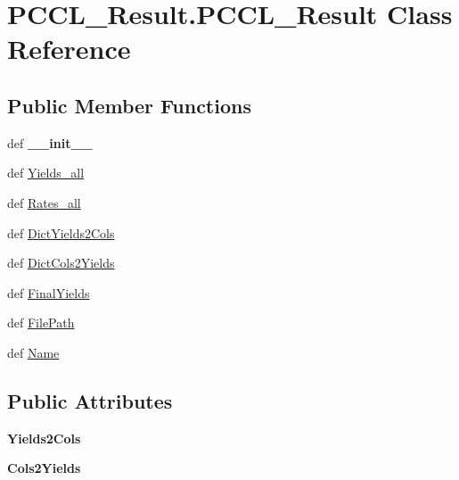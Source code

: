 \hypertarget{classPCCL__Result_1_1PCCL__Result}{\section{\-P\-C\-C\-L\-\_\-\-Result.\-P\-C\-C\-L\-\_\-\-Result \-Class \-Reference}
\label{classPCCL__Result_1_1PCCL__Result}
}
\subsection*{\-Public \-Member \-Functions}
\begin{DoxyCompactItemize}
\item 
\hypertarget{classPCCL__Result_1_1PCCL__Result_af3390b5f925964d5227a969d577efe32}{def {\bfseries \-\_\-\-\_\-init\-\_\-\-\_\-}}\label{classPCCL__Result_1_1PCCL__Result_af3390b5f925964d5227a969d577efe32}

\item 
def \hyperlink{classPCCL__Result_1_1PCCL__Result_a199c995af0719c0500a23e7092df6ad1}{\-Yields\-\_\-all}
\item 
def \hyperlink{classPCCL__Result_1_1PCCL__Result_a04fd246373c3dfa3360826416cfcdaae}{\-Rates\-\_\-all}
\item 
def \hyperlink{classPCCL__Result_1_1PCCL__Result_a1db7606bece3c3b78ae23ba23dca2a0b}{\-Dict\-Yields2\-Cols}
\item 
def \hyperlink{classPCCL__Result_1_1PCCL__Result_a64cf9033caccee7800ba4df915ba97e8}{\-Dict\-Cols2\-Yields}
\item 
def \hyperlink{classPCCL__Result_1_1PCCL__Result_a79e44dfa48b5a07b45c5b70ba75807df}{\-Final\-Yields}
\item 
def \hyperlink{classPCCL__Result_1_1PCCL__Result_aea2be91d16bbd012e000f6534001f633}{\-File\-Path}
\item 
def \hyperlink{classPCCL__Result_1_1PCCL__Result_a6df191b5655ab7926ac1bfb550cbb317}{\-Name}
\end{DoxyCompactItemize}
\subsection*{\-Public \-Attributes}
\begin{DoxyCompactItemize}
\item 
\hypertarget{classPCCL__Result_1_1PCCL__Result_af2b6c67c8b38b1c0f856f96a003d9142}{{\bfseries \-Yields2\-Cols}}\label{classPCCL__Result_1_1PCCL__Result_af2b6c67c8b38b1c0f856f96a003d9142}

\item 
\hypertarget{classPCCL__Result_1_1PCCL__Result_a0ae6f5e4da70a7caf2470b350b9a91cc}{{\bfseries \-Cols2\-Yields}}\label{classPCCL__Result_1_1PCCL__Result_a0ae6f5e4da70a7caf2470b350b9a91cc}

\end{DoxyCompactItemize}


